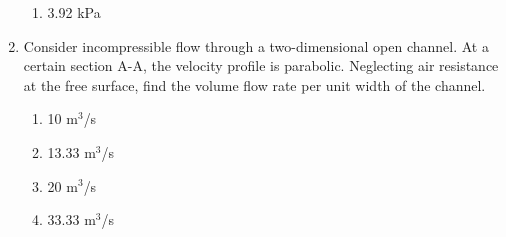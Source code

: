 \documentclass[journal]{IEEEtran}
\begin{document}
\begin{enumerate}
\begin{enumerate}
    \item 3.92 kPa \\
\end{enumerate}
\item Consider incompressible flow through a two-dimensional open channel. At a certain section A-A, the velocity profile is parabolic. Neglecting air resistance at the free surface, find the volume flow rate per unit width of the channel.
 \begin{figure}[!ht]
\centering
\resizebox{0.5\textwidth}{!}{%

}%
\end{figure}
 \begin{enumerate}
    \item 10 $\text{m}^3$/s
    \item 13.33 $\text{m}^3$/s
    \item 20 $\text{m}^3$/s
    \item 33.33 $\text{m}^3$/s \\
\end{enumerate}
			 \end{enumerate}
			 
\end{document}
